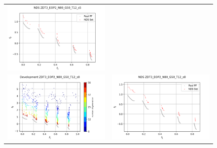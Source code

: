 \begin{figure}[H]
\begin{tabular}{c c}
    \includegraphics[scale=0.5]{figures/ZDT3_EOP2_N80_G50_T12/s5_nds.png}\\
    \includegraphics[scale=0.5]{figures/ZDT3_EOP2_N80_G50_T12/s8_dev.png} &
    \includegraphics[scale=0.5]{figures/ZDT3_EOP2_N80_G50_T12/s8_nds.png}\\

\end{tabular}
\end{figure}
